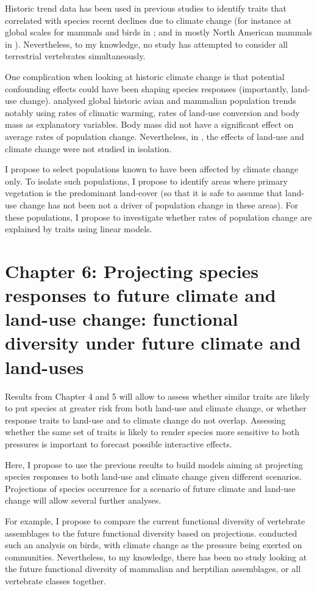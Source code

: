 Historic trend data has been used in previous studies to identify traits that correlated with species recent declines due to climate change (for instance at global scales for mammals and birds in \citet{Pacifici2017}; and in mostly North American mammals in \citet{Mccain2014}). Nevertheless, to my knowledge, no study has attempted to consider all terrestrial vertebrates simultaneously. 

One complication when looking at historic climate change is that potential confounding effects could have been shaping species responses (importantly, land-use change). \citet{Spooner2018} analysed global historic avian and mammalian population trends notably using rates of climatic warming, rates of land-use conversion and body mass as explanatory variables. Body mass did not have a significant effect on average rates of population change. Nevertheless, in \citet{Spooner2018}, the effects of land-use and climate change were not studied in isolation. 

I propose to select populations known to have been affected by climate change only. To isolate such populations, I propose to identify areas where primary vegetation is the predominant land-cover (so that it is safe to assume that land-use change has not been not a driver of population change in these areas). For these populations, I propose to investigate whether rates of population change are explained by traits using linear models.

\section{Chapter 6: Projecting species responses to future climate and land-use change: functional diversity under future climate and land-uses} 
Results from Chapter 4 and 5 will allow to assess whether similar traits are likely to put species at greater risk from both land-use and climate change, or whether response traits to land-use and to climate change do not overlap.  Assessing whether the same set of traits is likely to render species more sensitive to both pressures is important to forecast possible interactive effects. 

Here, I propose to use the previous results to build models aiming at projecting species responses to both land-use and climate change given different scenarios. Projections of species occurrence for a scenario of future climate and land-use change will allow several further analyses.

For example, I propose to compare the current functional diversity of vertebrate assemblages to the future functional diversity based on projections. \citet{BarbetMassin2015} conducted such an analysis on birds, with climate change as the pressure being exerted on communities. Nevertheless, to my knowledge, there has been no study looking at the future functional diversity of mammalian and herptilian assemblages, or all vertebrate classes together. 

